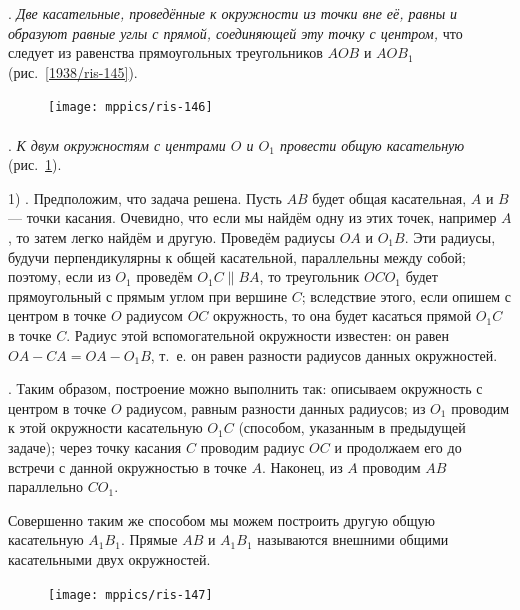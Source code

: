 \documentclass[oneside]{book}
\begin{document}
.
\emph{Две касательные, проведённые к окружности из точки вне её, равны и образуют равные углы с прямой, соединяющей эту точку с центром,} что следует из равенства прямоугольных треугольников $AOB$ и $AOB_1$ (рис.~\ref{1938/ris-145}).



\begin{figure}
\vskip-3mm
\centering
\texttt{[image: mppics/ris-146]}
\caption{}\label{1938/ris-146}
\end{figure}

\paragraph{}\label{1938/129}
\mbox{.}
\emph{К двум окружностям с центрами $O$ и $O_1$ провести общую касательную} (рис.~\ref{1938/ris-146}).

1) .
Предположим, что задача решена.
Пусть $AB$ будет общая касательная, $A$ и $B$ — точки касания.
Очевидно, что если мы найдём одну из этих точек, например $A$, то затем легко найдём и другую.
Проведём радиусы $OA$ и $O_1B$.
Эти радиусы, будучи перпендикулярны к общей касательной, параллельны между собой;
поэтому, если из $O_1$ проведём $O_1C\parallel BA$, то треугольник $OCO_1$ будет прямоугольный с прямым углом при вершине $C$;
вследствие этого, если опишем с центром в точке $O$ радиусом $OC$ окружность, то она будет касаться прямой $O_1C$ в точке $C$.
Радиус этой вспомогательной окружности известен:
он равен $OA-CA=OA-O_1B$, т.~е.
он равен разности радиусов данных окружностей.

.
Таким образом, построение можно выполнить так:
описываем окружность с центром в точке $O$ радиусом, равным разности данных радиусов;
из $O_1$ проводим к этой окружности касательную $O_1C$ (способом, указанным в предыдущей задаче);
через точку касания $C$ проводим радиус $OC$ и продолжаем его до встречи с данной окружностью в точке $A$.
Наконец, из $A$ проводим $AB$ параллельно $CO_1$.

Совершенно таким же способом мы можем построить другую общую касательную $A_1B_1$.
Прямые $AB$ и $A_1B_1$ называются внешними общими касательными двух окружностей.

\begin{figure}
\centering
\texttt{[image: mppics/ris-147]}
\caption{}\label{1938/ris-147}
\end{figure}
\end{document}
